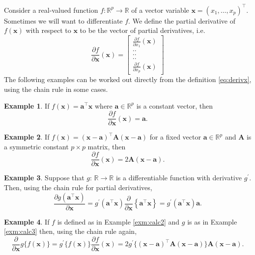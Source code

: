 \documentclass[
]{book}
\theoremstyle{definition}
\theoremstyle{definition}
\newtheorem{example}{Example}[chapter]
\theoremstyle{definition}
\theoremstyle{definition}
\theoremstyle{remark}
\begin{document}
Consider a real-valued function \(f: \mathbb{R}^p \rightarrow \mathbb{R}\) of a vector variable \(\mathbf x=(x_1, \ldots , x_p)^\top\). Sometimes we will want to differentiate \(f\). We define the partial derivative of \(f(\mathbf x)\) with respect to \(\mathbf x\) to be
the vector of partial derivatives, i.e.
\begin{equation}
\frac{\partial f}{\partial \mathbf x}(\mathbf x)=\left [ \begin{array}{c} \frac{\partial f}{\partial x_1}(\mathbf x)\\
 ..\\
 ..\\
 ..\\
 \frac{\partial f}{\partial x_p}(\mathbf x)
\end{array} \right ]
\label{eq:derivx}
\end{equation}
The following examples can be worked out directly from the definition \eqref{eq:derivx}, using the chain rule in some cases.

\begin{example}
\protect\hypertarget{exm:calc1}{}{\label{exm:calc1} }If \(f(\mathbf x)=\mathbf a^\top \mathbf x\) where \(\mathbf a\in \mathbb{R}^p\) is a constant vector, then
\[
\frac{\partial f}{\partial \mathbf x}(\mathbf x)=\mathbf a.
\]
\end{example}

\begin{example}
\protect\hypertarget{exm:calc2}{}{\label{exm:calc2} }If \(f(\mathbf x)=(\mathbf x-\mathbf a)^\top \mathbf A(\mathbf x-\mathbf a)\) for a fixed vector \(\mathbf a\in \mathbb{R}^p\)
and \(\mathbf A\) is a symmetric constant \(p \times p\) matrix, then
\[
\frac{\partial f}{\partial \mathbf x}(\mathbf x)=2\mathbf A(\mathbf x-\mathbf a).
\]
\end{example}

\begin{example}
\protect\hypertarget{exm:calc3}{}{\label{exm:calc3} }Suppose that \(g: \, \mathbb{R} \rightarrow \mathbb{R}\) is a differentiable function with derivative \(g^\prime\). Then, using the chain rule for partial derivatives,
\[
\frac{\partial g(\mathbf a^\top \mathbf x)}{\partial \mathbf x}=g^{\prime}(\mathbf a^\top\mathbf x)\frac{\partial}{\partial \mathbf x}\left \{\mathbf a^\top \mathbf x\right \}=g^{\prime}(\mathbf a^\top\mathbf x) \mathbf a.
\]
\end{example}

\begin{example}
\protect\hypertarget{exm:calc4}{}{\label{exm:calc4} }If \(f\) is defined as in Example \ref{exm:calc2} and \(g\) is as in Example \ref{exm:calc3} then, using the chain rule again,
\[
\frac{\partial }{\partial \mathbf x} g\{f(\mathbf x)\}=g^{\prime} \{f(\mathbf x)\}\frac{\partial f}{\partial \mathbf x}(\mathbf x)
=2 g^{\prime}\{(\mathbf x- \mathbf a)^\top \mathbf A(\mathbf x- \mathbf a)\}\mathbf A(\mathbf x-\mathbf a).
\]
\end{example}
\end{document}
